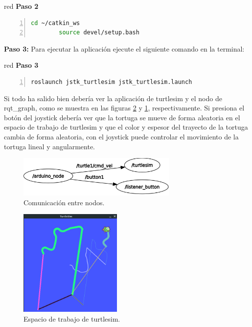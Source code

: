 \documentclass{article}
\begin{document}
\begin{bodyblock}{red}{ \textbf{Paso 2}}
  \begin{lstlisting}[language=bash, mathescape=true, breaklines=true,numbers=left,
    xleftmargin=0.03\textwidth, columns=fullflexible, flexiblecolumns=true, gobble=8]
        cd ~/catkin_ws
        source devel/setup.bash 
  \end{lstlisting}
\end{bodyblock}

\textbf{Paso 3:} Para ejecutar la aplicación ejecute el siguiente comando en la terminal:

\begin{bodyblock}{red}{ \textbf{Paso 3}}
  \begin{lstlisting}[language=bash, mathescape=true, breaklines=true,numbers=left,
    xleftmargin=0.03\textwidth, columns=fullflexible, flexiblecolumns=true, gobble=8]
        roslaunch jstk_turtlesim jstk_turtlesim.launch
  \end{lstlisting}
\end{bodyblock}

Si todo ha salido bien debería ver la aplicación de turtlesim y el nodo de rqt\_graph, como se muestra en las figuras \ref{fig:turtlesim2} y \ref{fig:joystick}, respectivamente. Si presiona el botón del joystick debería ver que la tortuga se mueve de forma aleatoria en el espacio de trabajo de turtlesim y que el color y espesor del trayecto de la tortuga cambia de forma aleatoria, con el joystick puede controlar el movimiento de la tortuga lineal y angularmente.

\begin{figure}[H]
  \centering
  \includegraphics[width=0.7\textwidth]{images/rqtgraph.png}
  \caption{Comunicación entre nodos.}
  \label{fig:joystick}
\end{figure}

\begin{figure}[H]
  \centering
  \includegraphics[width=0.45\textwidth ]{images/turtlesim.png}
  \caption{Espacio de trabajo de turtlesim.}
  \label{fig:turtlesim2}
\end{figure}
\end{document}
